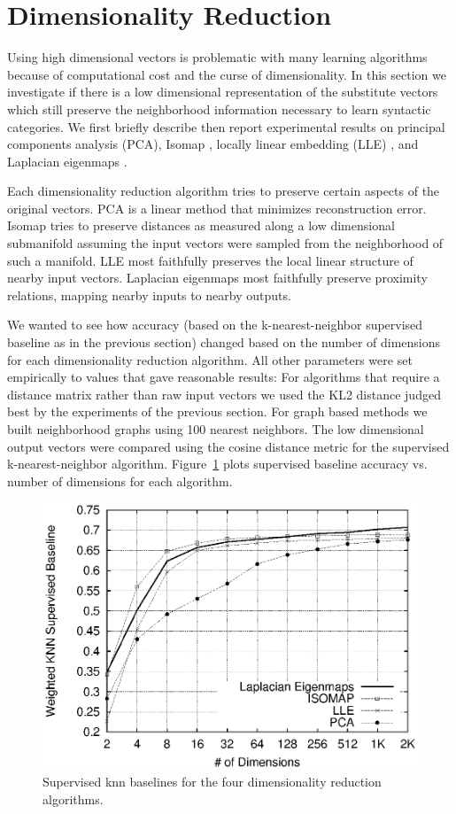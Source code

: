 \section{Dimensionality Reduction}
\label{sec:dimreduce}

Using high dimensional vectors is problematic with many learning
algorithms because of computational cost and the curse of
dimensionality.  In this section we investigate if there is a low
dimensional representation of the substitute vectors which still
preserve the neighborhood information necessary to learn syntactic
categories.  We first briefly describe then report experimental
results on principal components analysis (PCA), Isomap
\cite{tenenbaum2000global}, locally linear embedding (LLE)
\cite{roweis2000nonlinear}, and Laplacian eigenmaps
\cite{belkin2003laplacian}.  

Each dimensionality reduction algorithm tries to preserve certain
aspects of the original vectors.  PCA is a linear method that
minimizes reconstruction error.  Isomap tries to preserve distances as
measured along a low dimensional submanifold assuming the input
vectors were sampled from the neighborhood of such a manifold.  LLE
most faithfully preserves the local linear structure of nearby input
vectors.  Laplacian eigenmaps most faithfully preserve proximity
relations, mapping nearby inputs to nearby outputs.

We wanted to see how accuracy (based on the k-nearest-neighbor
supervised baseline as in the previous section) changed based on the
number of dimensions for each dimensionality reduction algorithm.  All
other parameters were set empirically to values that gave reasonable
results: For algorithms that require a distance matrix rather than raw
input vectors we used the KL2 distance judged best by the experiments
of the previous section.  For graph based methods we built
neighborhood graphs using 100 nearest neighbors.  The low dimensional
output vectors were compared using the cosine distance metric for the
supervised k-nearest-neighbor algorithm.  Figure~\ref{fig:dimreduce}
plots supervised baseline accuracy vs. number of dimensions for each
algorithm.

\begin{figure}[h]
\includegraphics[width=.5\textwidth]{baseline_graph_mono.eps}
\caption{Supervised knn baselines for the four dimensionality
  reduction algorithms.}
\label{fig:dimreduce}
\end{figure}

